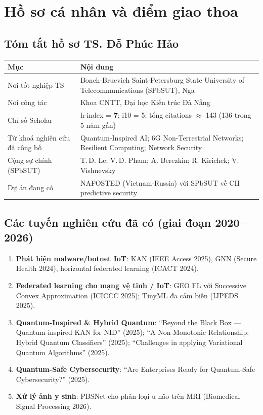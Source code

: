 \documentclass[11pt,a4paper]{article}
\begin{document}
\section{Hồ sơ cá nhân và điểm giao thoa}

\subsection{Tóm tắt hồ sơ TS. Đỗ Phúc Hảo}

\begin{longtable}{@{}p{4.5cm} p{11cm}@{}}
\toprule
\textbf{Mục} & \textbf{Nội dung} \\
\midrule
\endhead
Nơi tốt nghiệp TS & Bonch-Bruevich Saint-Petersburg State University of Telecommunications (SPbSUT), Nga \\
Nơi công tác & Khoa CNTT, Đại học Kiến trúc Đà Nẵng \\
Chỉ số Scholar & h-index = \textbf{7}; i10 = 5; tổng citations $\approx$ 143 (136 trong 5 năm gần) \\
Từ khoá nghiên cứu đã công bố & Quantum-Inspired AI; 6G Non-Terrestrial Networks; Resilient Computing; Network Security \\
Cộng sự chính (SPbSUT) & T.\,D. Le; V.\,D. Pham; A. Berezkin; R. Kirichek; V. Vishnevsky \\
Dự án đang có & NAFOSTED (Vietnam-Russia) với SPbSUT về CII predictive security \\
\bottomrule
\end{longtable}

\subsection{Các tuyến nghiên cứu đã có (giai đoạn 2020--2026)}

\begin{enumerate}
  \item \textbf{Phát hiện malware/botnet IoT}: KAN (IEEE Access 2025), GNN (Secure Health 2024), horizontal federated learning (ICACT 2024).
  \item \textbf{Federated learning cho mạng vệ tinh / IoT}: GEO FL với Successive Convex Approximation (ICICCC 2025); TinyML đa cảm biến (IJPEDS 2025).
  \item \textbf{Quantum-Inspired \& Hybrid Quantum}: ``Beyond the Black Box --- Quantum-inspired KAN for NID'' (2025); ``A Non-Monotonic Relationship: Hybrid Quantum Classifiers'' (2025); ``Challenges in applying Variational Quantum Algorithms'' (2025).
  \item \textbf{Quantum-Safe Cybersecurity}: ``Are Enterprises Ready for Quantum-Safe Cybersecurity?'' (2025).
  \item \textbf{Xử lý ảnh y sinh}: PBSNet cho phân loại u não trên MRI (Biomedical Signal Processing 2026).
\end{enumerate}
\end{document}

